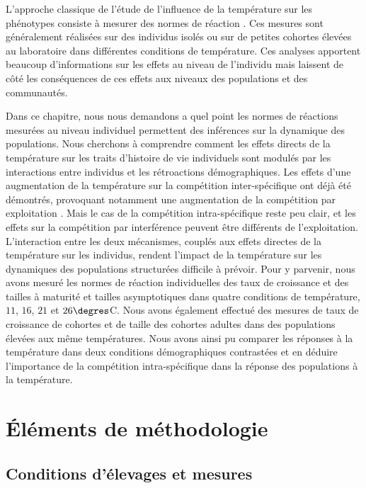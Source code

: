 L'approche classique de l'étude de l'influence de la température sur les
phénotypes consiste à mesurer des normes de réaction \autocites{woltereck1909a}.
Ces mesures sont généralement réalisées sur des individus isolés ou sur de
petites cohortes élevées au laboratoire dans différentes conditions de
température. Ces analyses apportent beaucoup d'informations sur les effets au
niveau de l'individu mais laissent de côté les conséquences de ces effets aux
niveaux des populations et des communautés. 

Dans ce chapitre, nous nous demandons a quel point les normes de réactions
mesurées au niveau individuel permettent des inférences sur la dynamique des
populations. Nous cherchons à comprendre comment les effets directs de la
température sur les traits d'histoire de vie individuels sont modulés par les
interactions entre individus et les rétroactions démographiques.
Les effets d'une augmentation de la température sur la compétition
inter-spécifique ont déjà été démontrés, provoquant notamment une augmentation
de la compétition par exploitation \autocites{ohlberger2011a}. Mais le cas de la
compétition intra-spécifique reste peu clair, et les effets sur la compétition par
interférence peuvent être différents de l'exploitation. L'interaction entre
les deux mécanismes, couplés aux effets directes de la température sur les individus,
rendent l'impact de la température sur les dynamiques des populations
structurées difficile à prévoir. Pour y parvenir, nous avons mesuré les normes de réaction
individuelles des taux de croissance et des tailles à maturité et tailles
asymptotiques dans quatre conditions de température, $11$, $16$, $21$ et
$26\degres$C. Nous avons également effectué des mesures de taux de croissance de
cohortes et de taille des cohortes adultes dans des populations élevées aux même
températures. Nous avons ainsi pu comparer les réponses à la température dans
deux conditions démographiques contrastées et en déduire l'importance de la
compétition intra-spécifique dans la réponse des populations à la température.

\section{Éléments de méthodologie}

\subsection{Conditions d'élevages et mesures}

